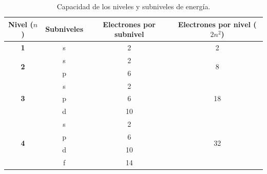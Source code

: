 \begin{table}[H]
    \centering
    \begin{tabular}{@{}cccc@{}}
        \toprule
        \textbf{Nivel (\(n\))} & \textbf{Subniveles} & \textbf{Electrones por subnivel} & \textbf{Electrones por nivel (\(2n^2\))} \\
        \midrule
        \textbf{1} & s & 2 & 2 \\[3pt]
        \multirow{2}{*}{\textbf{2}} & s & 2 & \multirow{2}{*}{8} \\[3pt]
         & p & 6 &  \\[3pt]
        \multirow{3}{*}{\textbf{3}} & s & 2 & \multirow{3}{*}{18} \\[3pt]
         & p & 6 &  \\[3pt]
         & d & 10 &  \\[3pt]
        \multirow{4}{*}{\textbf{4}} & s & 2 & \multirow{4}{*}{32} \\[3pt]
         & p & 6 &  \\[3pt]
         & d & 10 &  \\[3pt]
         & f & 14 &  \\
        \bottomrule
    \end{tabular}
    \caption{Capacidad de los niveles y subniveles de energía.}
    \label{tab:subniveles}
\end{table}

